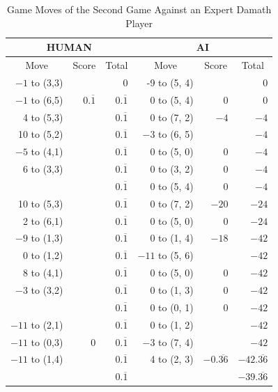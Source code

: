 \begin{appendices}
\begin{table}[H]
    \centering
    \begin{tabular}{rrrrrr}
        \hline
        \multicolumn{3}{c}{HUMAN}        & \multicolumn{3}{c}{AI}     \\ \hline
        \multicolumn{1}{c}{Move}         & \multicolumn{1}{c}{Score} & \multicolumn{1}{c}{Total} & \multicolumn{1}{c}{Move}         & \multicolumn{1}{c}{Score} & \multicolumn{1}{c}{Total} \\ \hline
          $-1$ to (3,3) &      &  0    &   -9 to (5, 4) &      &  0    \\ \hline
          $-1$ to (6,5) & $0.\overline{1}$ &  $0.\overline{1}$  &    0 to (5, 4) & 0      &  0    \\ \hline
          4 to (5,3) &      & $0.\overline{1}$  &    0 to (7, 2) &  $-4$    &  $-4$    \\ \hline
          10 to (5,2) &      &  $0.\overline{1}$    &    $-3$ to (6, 5) &      &  $-4$    \\ \hline
          $-5$ to (4,1) &      &  $0.\overline{1}$    &    0 to (5, 0) &  0    &  $-4$    \\ \hline
          6 to (3,3) &      &  $0.\overline{1}$    &    0 to (3, 2) &  0    &  $-4$    \\ \hline
                     &      &  $0.\overline{1}$    &    0 to (5, 4) &  0    &  $-4$    \\ \hline
          10 to (5,3) &      &  $0.\overline{1}$    &    0 to (7, 2) &  $-20$    &  $-24$    \\ \hline
          2 to (6,1) &      &  $0.\overline{1}$    &    0 to (5, 0) &  $0$    &  $-24$    \\ \hline
          $-9$ to (1,3) &      &  $0.\overline{1}$    &    0 to (1, 4) &  $-18$    &  $-42$    \\ \hline
          0 to (1,2) &      &  $0.\overline{1}$    &    $-11$ to (5, 6) &      &  $-42$    \\ \hline
          8 to (4,1) &      &  $0.\overline{1}$    &    0 to (5, 0) &  $0$    &  $-42$    \\ \hline
          $-3$ to (3,2) &      &  $0.\overline{1}$    &    0 to (1, 3) &  $0$    &  $-42$    \\ \hline
                     &      &  $0.\overline{1}$    &    0 to (0, 1) &  $0$    &  $-42$    \\ \hline
          $-11$ to (2,1) &      &  $0.\overline{1}$    &    0 to (1, 2) &      &  $-42$    \\ \hline
          $-11$ to (0,3) &  0    &  $0.\overline{1}$    &    $-3$ to (7, 4) &      &  $-42$    \\ \hline
          $-11$ to (1,4) &      &  $0.\overline{1}$    &    4 to (2, 3) &  $-0.\overline{36}$    &  $-42.\overline{36}$    \\ \hline \hline
                       &     &   $0.\overline{1}$  &                &          &  $-39.\overline{36}$ \\ \hline
    \end{tabular}
    \caption{Game Moves of the Second Game Against an Expert Damath Player}
    \label{tab:second-game}
\end{table}


\end{appendices}
